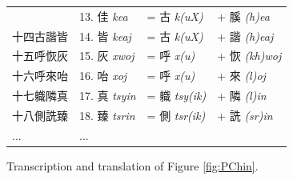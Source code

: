 \begin{figure}[ht]
\begin{tabular}{llll}
& 13. 佳 \textit{kea}
& =
古 \textit{k(uX)} 
& +
膎 \textit{(h)ea} \\
{\large 十四}古諧{\large 皆}

& 14. 皆 \textit{keaj}
& =
古 \textit{k(uX)}
& +
諧 \textit{(h)eaj} \\
{\large 十五}呼恢{\large 灰}

& 15. 灰 \textit{xwoj}
& =
呼 \textit{x(u)}
& +
恢 \textit{(kh)woj} \\
{\large 十六}呼來{\large 咍}

& 16. 咍 \textit{xoj}
& =
呼 \textit{x(u)}
& +
來 \textit{(l)oj} \\
{\large 十七}軄隣{\large 真}

& 17. 真 \textit{tsyin}
& =
軄 \textit{tsy(ik)}
& +
隣 \textit{(l)in} \\
{\large 十八}側詵{\large 臻}

& 18. 臻 \textit{tsrin}
& =
側 \textit{tsr(ik)}
& +
詵 \textit{(sr)in} \\
  ... &

 ... &
        \end{tabular}
\caption{Transcription and translation of Figure \ref{fig:PChin}.}
\end{figure}


